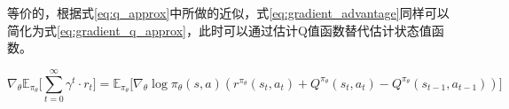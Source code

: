 等价的，根据式\ref{eq:q_approx}中所做的近似，式\ref{eq:gradient_advantage}同样可以简化为式\ref{eq:gradient_q_approx}，此时可以通过估计Q值函数替代估计状态值函数。

\begin{equation}
  \label{eq:gradient_q_approx}
    \nabla_{\theta}\mathbb{E}_{\pi_\theta}\bigg[\sum_{t=0}^{\infty} {\gamma^{t}} \cdot r_{t}\bigg]= \mathbb{E}_{\pi_\theta}\big[\nabla_\theta\operatorname{log}\pi_\theta(s,a)(r^{\pi_\theta}(s_t, a_t) + Q^{\pi_\theta}(s_t, a_t)-Q^{\pi_\theta}(s_{t-1}, a_{t-1})) \big]
\end{equation}










